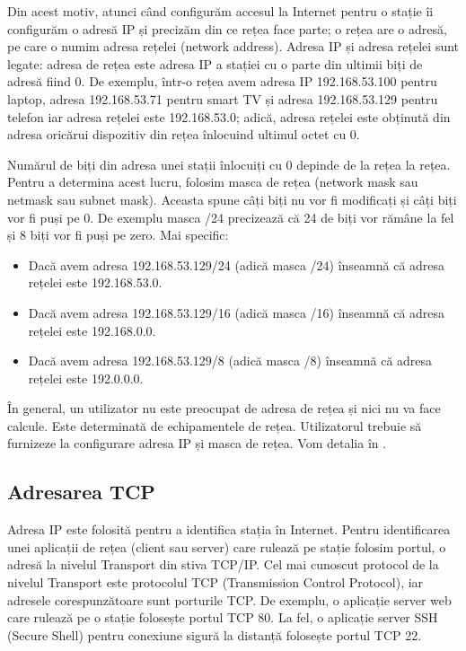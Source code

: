 Din acest motiv, atunci când configurăm accesul la Internet pentru o stație îi configurăm o adresă IP și precizăm din ce rețea face parte; o rețea are o adresă, pe care o numim adresa rețelei (network address). Adresa IP și adresa rețelei sunt legate: adresa de rețea este adresa IP a stației cu o parte din ultimii biți de adresă fiind 0. De exemplu, într-o rețea avem adresa IP 192.168.53.100 pentru laptop, adresa 192.168.53.71 pentru smart TV și adresa 192.168.53.129 pentru telefon iar adresa rețelei este 192.168.53.0; adică, adresa rețelei este obținută din adresa oricărui dispozitiv din rețea înlocuind ultimul octet cu 0.

Numărul de biți din adresa unei stații înlocuiți cu 0 depinde de la rețea la rețea. Pentru a determina acest lucru, folosim masca de rețea (network mask sau netmask sau subnet mask). Aceasta spune câți biți nu vor fi modificați și câți biți vor fi puși pe 0. De exemplu masca /24 precizează că 24 de biți vor rămâne la fel și 8 biți vor fi puși pe zero. Mai specific:

\begin{itemize}
  \item Dacă avem adresa 192.168.53.129/24 (adică masca /24) înseamnă că adresa rețelei este 192.168.53.0.
  \item Dacă avem adresa 192.168.53.129/16 (adică masca /16) înseamnă că adresa rețelei este 192.168.0.0.
  \item Dacă avem adresa 192.168.53.129/8 (adică masca /8) înseamnă că adresa rețelei este 192.0.0.0.
\end{itemize}

În general, un utilizator nu este preocupat de adresa de rețea și nici nu va face calcule. Este determinată de echipamentele de rețea. Utilizatorul trebuie să furnizeze la configurare adresa IP și masca de rețea. Vom detalia în .

\subsection{Adresarea TCP}
\label{sec:net:tcp-address}

Adresa IP este folosită pentru a identifica stația în Internet. Pentru identificarea unei aplicații de rețea (client sau server) care rulează pe stație folosim portul, o adresă la nivelul Transport din stiva TCP/IP. Cel mai cunoscut protocol de la nivelul Transport este protocolul TCP (Transmission Control Protocol), iar adresele corespunzătoare sunt porturile TCP. De exemplu, o aplicație server web care rulează pe o stație folosește portul TCP 80. La fel, o aplicație server SSH (Secure Shell) pentru conexiune sigură la distanță folosește portul TCP 22.

